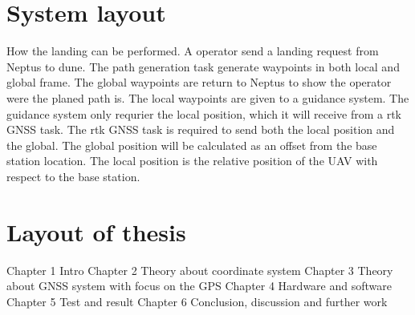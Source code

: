 \section{System layout}
How the landing can be performed. A operator send a landing request from Neptus to dune. The path generation task generate waypoints in both local and global frame. The global waypoints are return to Neptus to show the operator were the planed path is. The local waypoints are given to a guidance system. The guidance system only requrier the local position, which it will receive from a rtk GNSS task. The rtk GNSS task is required to send both the local position and the global. The global position will be calculated as an offset from the base station location. The local position is the relative position of the UAV with respect to the base station.
\section{Layout of thesis}
Chapter 1 Intro
Chapter 2 Theory about coordinate system
Chapter 3 Theory about GNSS system with focus on the GPS
Chapter 4 Hardware and software
Chapter 5 Test and result
Chapter 6 Conclusion, discussion and further work


